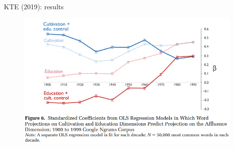 \documentclass[usenames,dvipsnames,english]{beamer}
\begin{document}
\begin{frame}{KTE (2019): results}
\begin{figure}
    \centering
    \includegraphics[scale = 0.5]{Images/kte_resultsOLS.png}
    \end{figure}
\end{frame}
\end{document}
